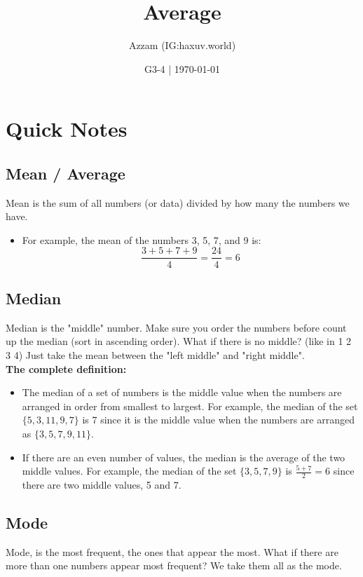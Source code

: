 \documentclass[11pt]{scrartcl}
\begin{document}
    \title{Average}
    \date{G3-4 | \today}
    \author{Azzam (IG:haxuv.world)}
    \maketitle

\section{Quick Notes}
\subsection{Mean / Average}
    Mean is the sum of all numbers (or data) divided by how many the numbers we have.
    \begin{itemize}
        \item For example, the mean of the numbers 3, 5, 7, and 9 is:
\[
\frac{3 + 5 + 7 + 9}{4} = \frac{24}{4} = 6
\]
    \end{itemize}


\subsection{Median}
    Median is the "middle" number. Make sure you order the numbers before count up the median (sort in ascending order). What if there is no middle? (like in 1 2 3 4) Just take the mean between the "left middle" and "right middle".\\
    \textbf{The complete definition:}
\begin{itemize}
    \item The median of a set of numbers is the middle value when the numbers are arranged in order from smallest to largest. For example, the median of the set $\{5, 3, 11, 9, 7\}$ is 7 since it is the middle value when the numbers are arranged as $\{3, 5, 7, 9, 11\}$.

    \item If there are an even number of values, the median is the average of the two middle values. For example, the median of the set $\{3, 5, 7, 9\}$ is $\frac{5 + 7}{2} = 6$ since there are two middle values, 5 and 7.
\end{itemize}

\newpage
\subsection{Mode}
    Mode, is the most frequent, the ones that appear the most. What if there are more than one numbers appear most frequent? We take them all as the mode.
\end{document}
